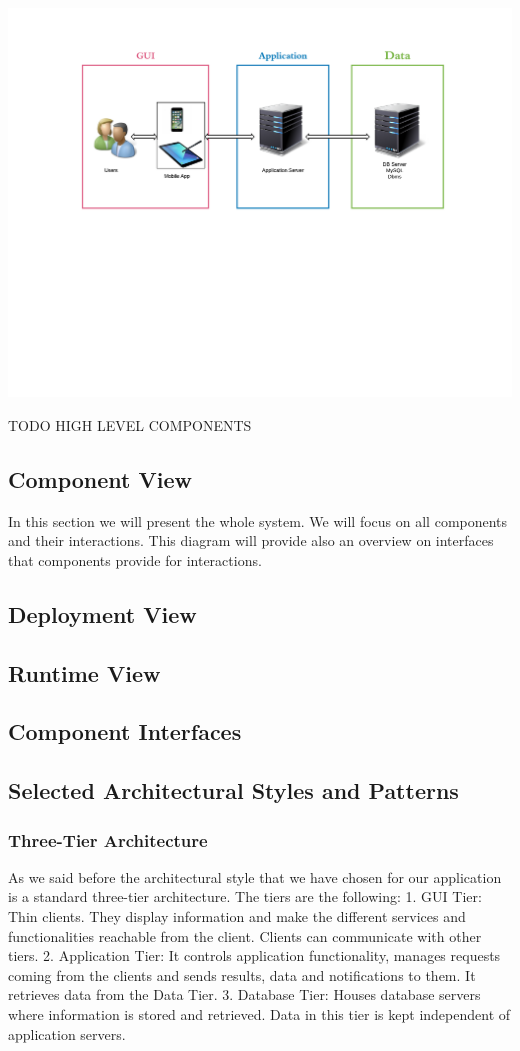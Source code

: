 \documentclass[12pt,titlepage]{article}
\begin{document}
\includegraphics[scale=0.5]{"General Architecture - Page 1"}

TODO HIGH LEVEL COMPONENTS
\subsection{Component View}
In this section we will present the whole system. We will focus on all components and their interactions. This diagram will provide also an overview on interfaces that components provide for interactions.
\subsection{Deployment View}
\subsection{Runtime View}
\subsection{Component Interfaces}
\subsection{Selected Architectural Styles and Patterns}
\subsubsection{Three-Tier Architecture} 
As we said before the architectural style that we have chosen for our application is a standard three-tier architecture. The tiers are the following:
1. GUI Tier: Thin clients. They display information and make the different services and functionalities reachable from the client. Clients can communicate with other tiers.
2. Application Tier: It controls application functionality, manages requests coming from the clients and sends results, data and notifications to them. It retrieves data from the Data Tier.
3. Database Tier: Houses database servers where information is stored and retrieved. Data in this tier is kept independent of application servers.
\end{document}
